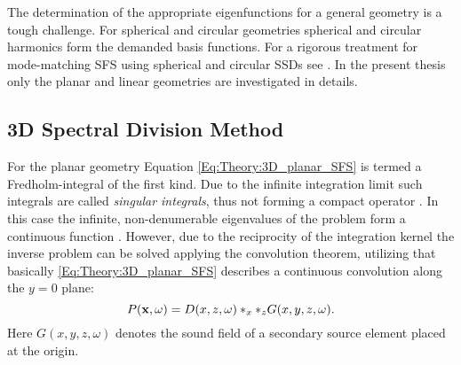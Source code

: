 The determination of the appropriate eigenfunctions for a general geometry is a tough challenge.
For spherical and circular geometries spherical and circular harmonics form the demanded basis functions. For a rigorous treatment for mode-matching SFS using spherical and circular SSDs see \cite{Ahrens2010phd,Zotter2009phd,Ahrens2012,Ahrens2009:circularSSD_mismatch,Ahrens2009:circular25D_SFR,Ahrens2008:Analytical_Circ_Spherical_SFS}.
In the present thesis only the planar and linear geometries are investigated in details.
 
\subsection{3D Spectral Division Method}
For the planar geometry Equation \eqref{Eq:Theory:3D_planar_SFS} is termed a Fredholm-integral of the first kind. Due to the infinite integration limit such integrals are called \emph{singular integrals}, thus not forming a compact operator \cite[p.~921.]{MorseFeshbach1953}. 
In this case the infinite, non-denumerable eigenvalues of the problem form a continuous function \cite{MorseFeshbach1953,Schultz2014:Comparing_approaches}.
However, due to the reciprocity of the integration kernel the inverse problem can be solved applying the convolution theorem, utilizing that basically \eqref{Eq:Theory:3D_planar_SFS} describes a continuous convolution along the $y=0$ plane:
\begin{equation}
P(\mathbf{x},\omega) = D(x,z,\omega)\ast_{x} \ast_{z} G(x,y,z,\omega).
\end{equation}
Here $G(x,y,z,\omega)$ denotes the sound field of a secondary source element placed at the origin.

